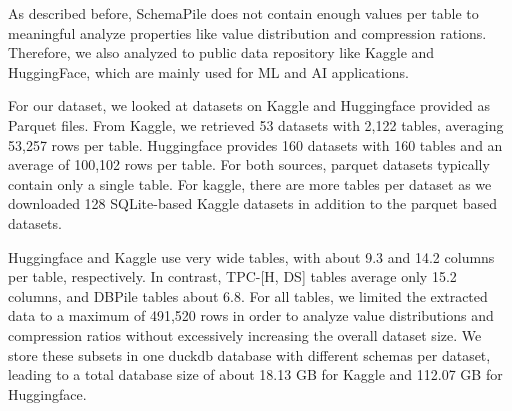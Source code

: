
As described before, SchemaPile does not contain enough values per table to meaningful analyze properties like 
value distribution and compression rations. Therefore, we also analyzed to public data repository like Kaggle
and HuggingFace, which are mainly used for ML and AI applications.

For our dataset, we looked at datasets on Kaggle and Huggingface provided as Parquet files. 
From Kaggle, we retrieved 53 datasets with 2,122 tables, 
averaging 53,257 rows per table. Huggingface provides 160 
datasets with 160 tables and an average of 100,102 rows per table.
For both sources, parquet datasets typically contain only a 
single table. For kaggle, there are more tables per dataset as we downloaded 128 SQLite-based 
Kaggle datasets in addition to the parquet based datasets.

Huggingface and Kaggle use very wide tables, with about 9.3 
and 14.2 columns per table, respectively. In contrast, TPC-[H, DS] 
tables average only 15.2 columns, and DBPile tables about 
6.8. For all tables, we limited the extracted data to a maximum of 
491,520 rows in order to analyze value distributions and compression 
ratios without excessively increasing the overall dataset size. We store these subsets in one 
duckdb database with different schemas per dataset, leading to a total database size of about
18.13 GB for Kaggle and 112.07 GB for Huggingface.
